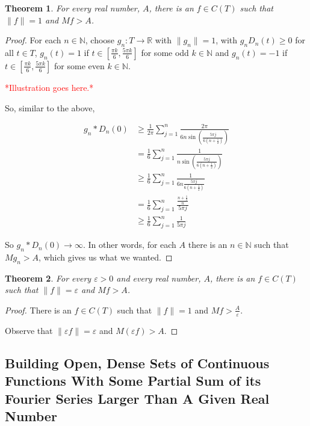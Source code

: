 \documentclass{amsart}
\newcommand{\vep}{\varepsilon}
\newcommand{\N}{\mathbb{N}}
\newcommand{\R}{\mathbb{R}}
\newcommand{\colorcomment}[2]{\textcolor{#1}{#2}} %
\newcommand{\norm}[1]{\|#1\|}
\newtheorem{thm}{Theorem}[section]
\theoremstyle{definition}
\begin{document}
\begin{thm}
For every real number, $A$, there is an $f \in C(T)$ such that $\norm{f} = 1$ and $Mf > A$. 
\end{thm}

\begin{proof}
For each $n \in \N$, choose $g_n: T \to \R$ with $\norm{g_n} = 1$, with $g_nD_n(t) \geq 0$ for all $t \in T$,  $g_n(t) = 1$ if $t \in [\frac{\pi k}{6},\frac{5 \pi k}{6}]$ for some odd $k \in \N$  and $g_n(t) = -1$ if $t \in [\frac{\pi k}{6},\frac{5 \pi k}{6}]$ for some even $k \in \N$.

\colorcomment{red}{*Illustration goes here.*}

So, similar to the above,

\begin{align*}
g_n \ast D_n(0) &\geq \frac{1}{2 \pi} \sum\limits_{j=1}^n \frac{2 \pi}{6n \sin(\frac{5\pi j}{6(n+\frac{1}{2})})}\\
&= \frac{1}{6} \sum\limits_{j=1}^n \frac{1}{n \sin(\frac{5\pi j}{6(n+\frac{1}{2})})}\\
&\geq \frac{1}{6} \sum\limits_{j=1}^n \frac{1}{6n \frac{5\pi j}{6(n+\frac{1}{2})}}\\
&= \frac{1}{6} \sum\limits_{j=1}^n \frac{\frac{n+\frac{1}{2}}{n}}{5\pi j}\\
&\geq \frac{1}{6} \sum\limits_{j=1}^n \frac{1}{5\pi j}
\end{align*}

So $g_n \ast D_n(0) \to \infty$. In other words, for each $A$ there is an $n \in \N$ such that $Mg_n > A$, which gives us what we wanted.

\end{proof}

\begin{thm}
For every $\vep >0$ and every real number, $A$, there is an $f \in C(T)$ such that $\norm{f} = \vep $ and $Mf > A$. 

\end{thm}

\begin{proof}
There is an $f \in C(T)$ such that $\norm{f} = 1$ and $Mf > \frac{A}{\vep}$.

Observe that $\norm{\vep f} = \vep$ and $M(\vep f) > A$.

\end{proof}

\subsection{Building Open, Dense Sets of Continuous Functions With Some Partial Sum of its Fourier Series Larger Than A Given Real Number}
\end{document}
